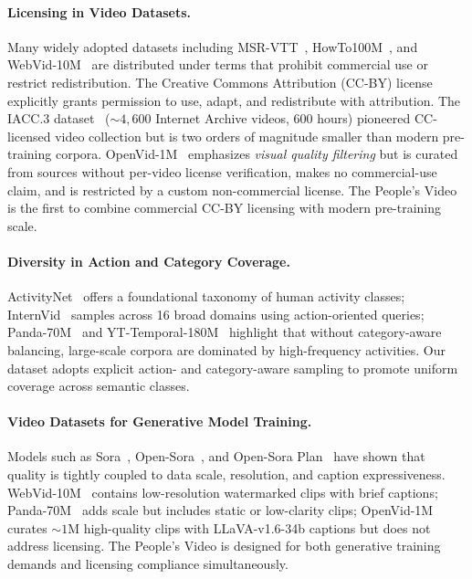 \documentclass{article}
\begin{document}
\paragraph{Licensing in Video Datasets.}
Many widely adopted datasets including MSR-VTT~\cite{xu2016msrvtt}, HowTo100M~\cite{miech2019howto100m}, and WebVid-10M~\cite{bain2021frozen} are distributed under terms that prohibit commercial use or restrict redistribution. The Creative Commons Attribution (CC-BY) license explicitly grants permission to use, adapt, and redistribute with attribution. The IACC.3 dataset~\cite{awad2022iacc3} (${\sim}4{,}600$ Internet Archive videos, 600 hours) pioneered CC-licensed video collection but is two orders of magnitude smaller than modern pre-training corpora. OpenVid-1M~\cite{nan2024openvid} emphasizes \emph{visual quality filtering} but is curated from sources without per-video license verification, makes no commercial-use claim, and is restricted by a custom non-commercial license. The People's Video is the first to combine commercial CC-BY licensing with modern pre-training scale.

\paragraph{Diversity in Action and Category Coverage.}
ActivityNet~\cite{heilbron2015activitynet} offers a foundational taxonomy of human activity classes; InternVid~\cite{wang2024internvid} samples across 16 broad domains using action-oriented queries; Panda-70M~\cite{chen2024panda70m} and YT-Temporal-180M~\cite{zellers2022merlot} highlight that without category-aware balancing, large-scale corpora are dominated by high-frequency activities. Our dataset adopts explicit action- and category-aware sampling to promote uniform coverage across semantic classes.

\paragraph{Video Datasets for Generative Model Training.}
Models such as Sora~\cite{brooks2024sora}, Open-Sora~\cite{zheng2024opensora}, and Open-Sora Plan~\cite{lin2024opensoraplan} have shown that quality is tightly coupled to data scale, resolution, and caption expressiveness. WebVid-10M~\cite{bain2021frozen} contains low-resolution watermarked clips with brief captions; Panda-70M~\cite{chen2024panda70m} adds scale but includes static or low-clarity clips; OpenVid-1M~\cite{nan2024openvid} curates ${\sim}1$M high-quality clips with LLaVA-v1.6-34b captions but does not address licensing. The People's Video is designed for both generative training demands and licensing compliance simultaneously.
\end{document}
